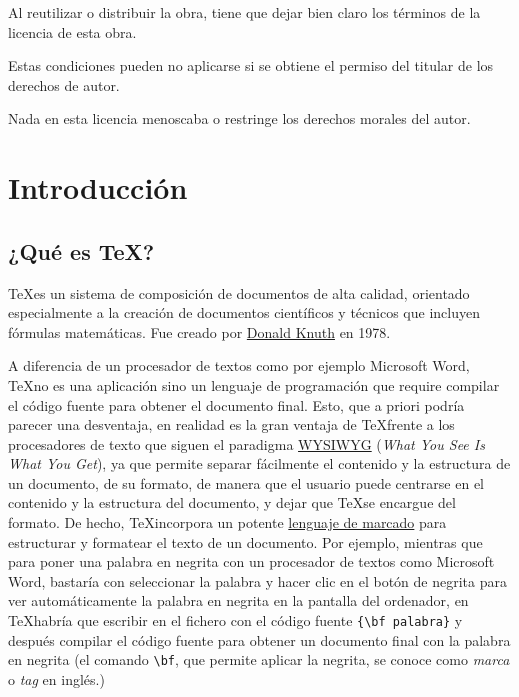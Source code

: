 \documentclass[
  letterpaper,
  DIV=11,
  numbers=noendperiod]{scrreport}
\begin{document}
Al reutilizar o distribuir la obra, tiene que dejar bien claro los
términos de la licencia de esta obra.

Estas condiciones pueden no aplicarse si se obtiene el permiso del
titular de los derechos de autor.

Nada en esta licencia menoscaba o restringe los derechos morales del
autor.


\hypertarget{introducciuxf3n}{%
\chapter{Introducción}\label{introducciuxf3n}}

\hypertarget{quuxe9-es-tex}{%
\section{\texorpdfstring{¿Qué es
\TeX?}{¿Qué es \textbackslash TeX?}}\label{quuxe9-es-tex}}

\TeX es un sistema de composición de documentos de alta calidad,
orientado especialmente a la creación de documentos científicos y
técnicos que incluyen fórmulas matemáticas. Fue creado por
\href{https://es.wikipedia.org/wiki/Donald_Knuth}{Donald Knuth} en 1978.

A diferencia de un procesador de textos como por ejemplo Microsoft Word,
\TeX no es una aplicación sino un lenguaje de programación que
require compilar el código fuente para obtener el documento final. Esto,
que a priori podría parecer una desventaja, en realidad es la gran
ventaja de \TeX frente a los procesadores de texto que siguen el
paradigma \href{https://es.wikipedia.org/wiki/WYSIWYG}{WYSIWYG}
(\emph{What You See Is What You Get}), ya que permite separar fácilmente
el contenido y la estructura de un documento, de su formato, de manera
que el usuario puede centrarse en el contenido y la estructura del
documento, y dejar que \TeX se encargue del formato. De hecho,
\TeX incorpora un potente
\href{https://es.wikipedia.org/wiki/Lenguaje_de_marcado}{lenguaje de
marcado} para estructurar y formatear el texto de un documento. Por
ejemplo, mientras que para poner una palabra en negrita con un
procesador de textos como Microsoft Word, bastaría con seleccionar la
palabra y hacer clic en el botón de negrita para ver automáticamente la
palabra en negrita en la pantalla del ordenador, en \TeX habría que
escribir en el fichero con el código fuente
\texttt{\{\textbackslash{}bf\ palabra\}} y después compilar el código
fuente para obtener un documento final con la palabra en negrita (el
comando \texttt{\textbackslash{}bf}, que permite aplicar la negrita, se
conoce como \emph{marca} o \emph{tag} en inglés.)
\end{document}
